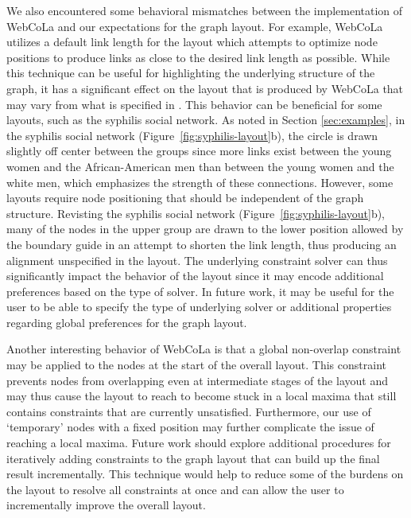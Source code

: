 We also encountered some behavioral mismatches between the implementation
of WebCoLa and our expectations for the graph layout. For example, WebCoLa
utilizes a default link length for the layout which attempts to optimize
node positions to produce links as close to the desired link length as
possible. While this technique can be useful for highlighting the underlying 
structure of the graph, it has a significant effect on the layout that is
produced by WebCoLa that may vary from what is specified in \projectname.
This behavior can be beneficial for some layouts, such as the syphilis social network.
As noted in Section \ref{sec:examples}, in the syphilis social network
(Figure~\ref{fig:syphilis-layout}b), the circle is drawn slightly off
center between the groups since more links exist between the
young women and the African-American men than between the young women and
the white men, which emphasizes the strength of these
connections. However, some layouts require node positioning that should be
independent of the graph structure. Revisting the syphilis social network
(Figure~\ref{fig:syphilis-layout}b), many of the nodes in the upper group
are drawn to the lower position allowed by the boundary guide in an attempt
to shorten the link length, thus producing an alignment unspecified in the
layout. The underlying constraint solver can thus significantly impact the
behavior of the layout since it may encode additional preferences based on
the type of solver. In future work, it may be useful for the user to be able
to specify the type of underlying solver or additional properties regarding
global preferences for the graph layout.

Another interesting behavior of WebCoLa is that a global non-overlap constraint
may be applied to the nodes at the start of the overall layout. This constraint
prevents nodes from overlapping even at intermediate stages of the layout and
may thus cause the layout to reach to become stuck in a local maxima that still
contains constraints that are currently unsatisfied. Furthermore, our use of
`temporary' nodes with a fixed position may further complicate the issue of
reaching a local maxima. Future work should explore additional procedures for
iteratively adding constraints to the graph layout that can build up the final
result incrementally. This technique would help to reduce some of the burdens
on the layout to resolve all constraints at once and can allow the user to
incrementally improve the overall layout.
